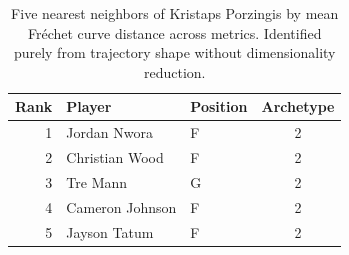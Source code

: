 \begin{table}[htbp]
  \centering\small
  \begin{tabular}{rllc}
    \toprule
    Rank & Player & Position & Archetype \\
    \midrule
    1 & Jordan Nwora & F & 2 \\
    2 & Christian Wood & F & 2 \\
    3 & Tre Mann & G & 2 \\
    4 & Cameron Johnson & F & 2 \\
    5 & Jayson Tatum & F & 2 \\
    \bottomrule
  \end{tabular}
  \caption{Five nearest neighbors of Kristaps Porzingis by mean Fr\'{e}chet curve distance across metrics. Identified purely from trajectory shape without dimensionality reduction.}
  \label{tab:Kristaps_Porzingis_frechet_curve_neighbors}
\end{table}

